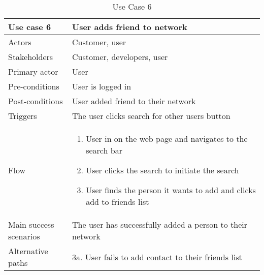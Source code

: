 \begin{table}[H]
\begin{tabular}{ | L{0.25\linewidth} | L{0.75\linewidth} | } 
 \hline {}
 Use case 6 & User adds friend to network  \\ 
 \hline
 Actors & Customer, user \\ 
 \hline
 Stakeholders & Customer, developers, user \\ 
  \hline
 Primary actor & User  \\ 
 \hline
 Pre-conditions & User is logged in \\ 
 \hline
 Post-conditions & User added friend to their network \\ 
  \hline
 Triggers & The user clicks search for other users button  \\ 
 \hline
Flow & \begin{minipage}{5in}
    \vskip 1pt
    \begin{enumerate}
  \item User in on the web page and navigates to the search bar
  \item User clicks the search to initiate the search
  \item User finds the person it wants to add and clicks add to friends list
   \end{enumerate}
   \vskip 4pt
 \end{minipage}\\ 
 \hline
 Main success scenarios & The user has successfully added a person to their network \\ 
 \hline
 Alternative paths & 3a. User fails to add contact to their friends list\\
 \hline
\end{tabular}
\caption{Use Case 6}
\end{table}


